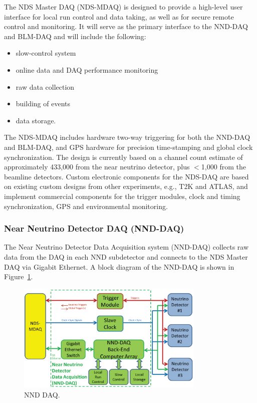 The NDS Master DAQ (NDS-MDAQ) is designed to provide a high-level user
interface for local run control and data taking, as well as for secure
remote control and monitoring.  It will serve as the primary interface
to the NND-DAQ and BLM-DAQ and will include the following:
\begin{itemize}
\item slow-control system 
\item online data and DAQ performance monitoring  
\item raw data collection
\item building of events
\item data storage.   
\end{itemize}
The NDS-MDAQ includes hardware two-way triggering for both the NND-DAQ
and BLM-DAQ, and GPS hardware for precision time-stamping and global
clock synchronization.  The design is currently based on a channel
count estimate of approximately 433,000 from the near neutrino
detector, plus $<$1,000 from the beamline detectors.  Custom
electronic components for the NDS-DAQ are based on existing custom
designs from other experiments, e.g., T2K and ATLAS, and implement
commercial components for the trigger modules, clock and timing
synchronization, GPS and environmental monitoring.

\subsubsection{Near Neutrino Detector DAQ (NND-DAQ)} 
\label{cdrsec:nd:nnd:daq}


The Near Neutrino Detector Data Acquisition system (NND-DAQ) collects
raw data from the DAQ in each NND subdetector and connects to the NDS
Master DAQ via Gigabit Ethernet. A block diagram of the NND-DAQ is
shown in Figure~\ref{fig:nds-daq-block}. 

\begin{figure}[h!]
\centering
\includegraphics[width=0.8\textwidth]{daq-nnd-block-diagram.png}
\caption{NND DAQ.}
\label{fig:nds-daq-block}
\end{figure}

